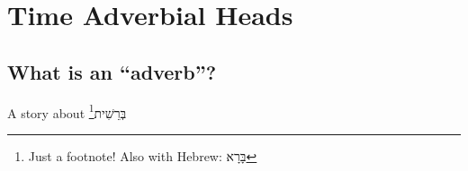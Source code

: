 
\chapter{Time Adverbial Heads}  %



\section{What is an ``adverb''?}

A story about \texthebrew{בְּרֵשִׁית}\footnote{Just a footnote! Also with Hebrew: \texthebrew{בָּרָא}}
